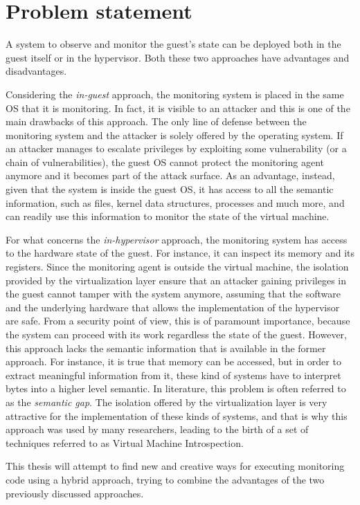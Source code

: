\section{Problem statement}
A system to observe and monitor the guest's state can be deployed both in the guest itself or in the hypervisor. Both these two approaches have advantages and disadvantages. 
\par
Considering the \emph{in-guest} approach, the monitoring system is placed in the same OS that it is monitoring. In fact, it is visible to an attacker and this is one of the main drawbacks of this approach. The only line of defense between the monitoring system and the attacker is solely offered by the operating system. If an attacker manages to escalate privileges by exploiting some vulnerability (or a chain of vulnerabilities), the guest OS cannot protect the monitoring agent anymore and it becomes part of the attack surface. As an advantage, instead, given that the system is inside the guest OS, it has access to all the semantic information, such as files, kernel data structures, processes and much more, and can readily use this information to monitor the state of the virtual machine. 
\par
For what concerns the \emph{in-hypervisor} approach, the monitoring system has access to the hardware state of the guest. For instance, it can inspect its memory and its registers. Since the monitoring agent is outside the virtual machine, the isolation provided by the virtualization layer ensure that an attacker gaining privileges in the guest cannot tamper with the system anymore, assuming that the software and the underlying hardware that allows the implementation of the hypervisor are safe. From a security point of view, this is of paramount importance, because the system can proceed with its work regardless the state of the guest. However, this approach lacks the semantic information that is available in the former approach. For instance, it is true that memory can be accessed, but in order to extract meaningful information from it, these kind of systems have to interpret bytes into a higher level semantic. In literature, this problem is often referred to as the \emph{semantic gap}. The isolation offered by the virtualization layer is very attractive for the implementation of these kinds of systems, and that is why this approach was used by many researchers, leading to the birth of a set of techniques referred to as Virtual Machine Introspection. 
\par 
This thesis will attempt to find new and creative ways for executing monitoring code using a hybrid approach, trying to combine the advantages of the two previously discussed approaches.

